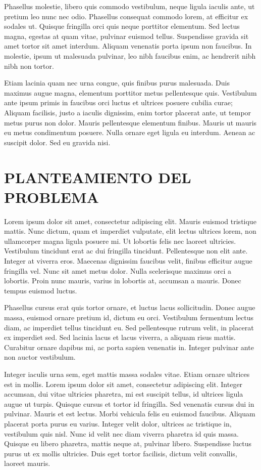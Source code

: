 \documentclass[stu, 12pt, helv, letterpaper, donotrepeattitle, floatsintext, natbib]{apa7}
\begin{document}
Phasellus molestie, libero quis commodo vestibulum, neque ligula iaculis ante, ut pretium leo nunc nec odio. Phasellus consequat commodo lorem, at efficitur ex sodales ut. Quisque fringilla orci quis neque porttitor elementum. Sed lectus magna, egestas at quam vitae, pulvinar euismod tellus. Suspendisse gravida sit amet tortor sit amet interdum. Aliquam venenatis porta ipsum non faucibus. In molestie, ipsum ut malesuada pulvinar, leo nibh faucibus enim, ac hendrerit nibh nibh non tortor.

Etiam lacinia quam nec urna congue, quis finibus purus malesuada. Duis maximus augue magna, elementum porttitor metus pellentesque quis. Vestibulum ante ipsum primis in faucibus orci luctus et ultrices posuere cubilia curae; Aliquam facilisis, justo a iaculis dignissim, enim tortor placerat ante, ut tempor metus purus non dolor. Mauris pellentesque elementum finibus. Mauris ut mauris eu metus condimentum posuere. Nulla ornare eget ligula eu interdum. Aenean ac suscipit dolor. Sed eu gravida nisi.

\newpage

\section*{PLANTEAMIENTO DEL PROBLEMA}


Lorem ipsum dolor sit amet, consectetur adipiscing elit. Mauris euismod tristique mattis. Nunc dictum, quam et imperdiet vulputate, elit lectus ultrices lorem, non ullamcorper magna ligula posuere mi. Ut lobortis felis nec laoreet ultricies. Vestibulum tincidunt erat ac dui fringilla tincidunt. Pellentesque non elit ante. Integer at viverra eros. Maecenas dignissim faucibus velit, finibus efficitur augue fringilla vel. Nunc sit amet metus dolor. Nulla scelerisque maximus orci a lobortis. Proin nunc mauris, varius in lobortis at, accumsan a mauris. Donec tempus euismod luctus.

Phasellus cursus erat quis tortor ornare, et luctus lacus sollicitudin. Donec augue massa, euismod ornare pretium id, dictum eu orci. Vestibulum fermentum lectus diam, ac imperdiet tellus tincidunt eu. Sed pellentesque rutrum velit, in placerat ex imperdiet sed. Sed lacinia lacus et lacus viverra, a aliquam risus mattis. Curabitur ornare dapibus mi, ac porta sapien venenatis in. Integer pulvinar ante non auctor vestibulum.

Integer iaculis urna sem, eget mattis massa sodales vitae. Etiam ornare ultrices est in mollis. Lorem ipsum dolor sit amet, consectetur adipiscing elit. Integer accumsan, dui vitae ultricies pharetra, mi est suscipit tellus, id ultrices ligula augue ut turpis. Quisque cursus et tortor id fringilla. Sed venenatis cursus dui in pulvinar. Mauris et est lectus. Morbi vehicula felis eu euismod faucibus. Aliquam placerat porta purus eu varius. Integer velit dolor, ultrices ac tristique in, vestibulum quis nisl. Nunc id velit nec diam viverra pharetra id quis massa. Quisque eu libero pharetra, mattis neque at, pulvinar libero. Suspendisse luctus purus ut ex mollis ultricies. Duis eget tortor facilisis, dictum velit convallis, laoreet mauris.
\end{document}

